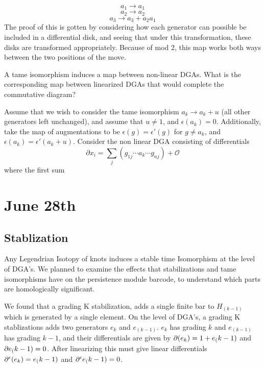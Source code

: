 \documentclass[11pt,oneside]{amsart}
\begin{document}
\[a_1 \rightarrow a_1\]
\[a_2 \rightarrow a_2\]
\[a_3 \rightarrow a_3 + a_2a_1\]
The proof of this is gotten by considering how each generator can possible be included in a differential disk, and seeing that under this transformation, these disks are transformed appropriately. Because of mod 2, this map works both ways between the two positions of the move.


\begin{lemma}

A tame isomorphism induces a map between non-linear DGAs. What is the corresponding map between linearized DGAs that would complete the commutative diagram?

Assume that we wish to consider the tame isomorphism $a_k \rightarrow a_k + u$ (all other generators left unchanged), and assume that $u \neq 1$, and $\epsilon(a_k) = 0$. Additionally, take the map of augmentations to be $\epsilon(g) = \epsilon'(g)$ for $g \neq a_k$, and $\epsilon(a_k) = \epsilon'(a_k + u)$. Consider the non linear DGA consisting of differentials 
\[\partial x_i = \sum_{j} (g_{1j} \cdots a_k \cdots g_{nj}) + \mathcal{O}\]
where the first sum 


    
\end{lemma}





\section{June 28th}

\subsection{Stablization}

    Any Legendrian Isotopy of knots induces a stable time Isomorphism at the level of DGA's.  We planned to examine the effects that stabilizations and tame isomorphisms have on the persistence module barcode, to understand which parts are homologically significant. 
    
    We found that a grading K stabilization, adds a single finite bar to $H_(k-1)$ which is generated by a single element. On the level of DGA's, a grading K stablizations adds two generators $e_k$ and $e_(k-1)$. $e_k$ has grading $k$ and $e_(k-1)$ has grading $k-1$, and their differentials are given by $\partial (e_k) = 1 + e_(k-1)$ and $\partial e_(k-1) = 0$. After linearizing this must give linear differentials $\partial^\epsilon (e_k) = e_(k-1)$ and $\partial^\epsilon e_(k-1) = 0$. 
\end{document}
